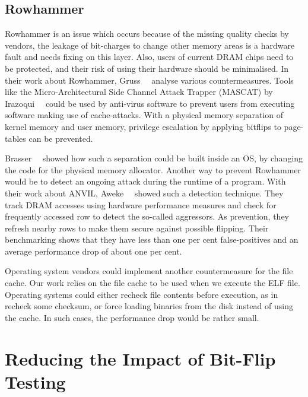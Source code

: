 \subsection{Rowhammer}

Rowhammer is an issue which occurs because of the missing quality checks by
vendors, the leakage of bit-charges to change other memory areas is a hardware
fault and needs fixing on this layer. Also, users of current DRAM chips need to
be protected, and their risk of using their hardware should be minimalised. In
their work about Rowhammer, Gruss~\etal~\cite{flipinthewall} analyse various
countermeasures. Tools like the Micro-Architectural Side Channel Attack Trapper
(MASCAT) by Irazoqui~\etal~\cite{mascat} could be used by anti-virus software to
prevent users from executing software making use of cache-attacks. With a
physical memory separation of kernel memory and user memory, privilege
escalation by applying bitflips to page-tables can be prevented.

Brasser~\etal~\cite{canttouch} showed how such a separation could be built
inside an OS, by changing the code for the physical memory allocator. Another
way to prevent Rowhammer would be to detect an ongoing attack during the runtime
of a program. With their work about ANVIL, Aweke~\etal~\cite{anvil} showed such
a detection technique. They track DRAM accesses using hardware performance
measures and check for frequently accessed row to detect the so-called
aggressors. As prevention, they refresh nearby rows to make them secure against
possible flipping. Their benchmarking shows that they have less than one per
cent false-positives and an average performance drop of about one per cent.

Operating system vendors could implement another countermeasure for the file
cache. Our work relies on the file cache to be used when we execute the ELF
file. Operating systems could either recheck file contents before execution, as
in recheck some checksum, or force loading binaries from the disk instead of
using the cache. In such cases, the performance drop would be rather small.

\section{Reducing the Impact of Bit-Flip Testing}

